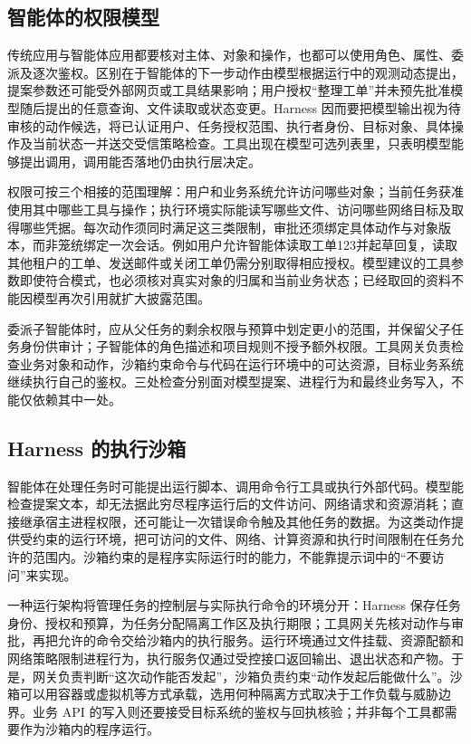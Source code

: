 \documentclass[../textbook.tex]{subfiles}
\begin{document}
\subsection{智能体的权限模型}
传统应用与智能体应用都要核对主体、对象和操作，也都可以使用角色、属性、委派及逐次鉴权。区别在于智能体的下一步动作由模型根据运行中的观测动态提出，提案参数还可能受外部网页或工具结果影响；用户授权“整理工单”并未预先批准模型随后提出的任意查询、文件读取或状态变更。Harness 因而要把模型输出视为待审核的动作候选，将已认证用户、任务授权范围、执行者身份、目标对象、具体操作及当前状态一并送交受信策略检查。工具出现在模型可选列表里，只表明模型能够提出调用，调用能否落地仍由执行层决定。

权限可按三个相接的范围理解：用户和业务系统允许访问哪些对象；当前任务获准使用其中哪些工具与操作；执行环境实际能读写哪些文件、访问哪些网络目标及取得哪些凭据。每次动作须同时满足这三类限制，审批还须绑定具体动作与对象版本，而非笼统绑定一次会话。例如用户允许智能体读取工单123并起草回复，读取其他租户的工单、发送邮件或关闭工单仍需分别取得相应授权。模型建议的工具参数即使符合模式，也必须核对真实对象的归属和当前业务状态；已经取回的资料不能因模型再次引用就扩大披露范围。

委派子智能体时，应从父任务的剩余权限与预算中划定更小的范围，并保留父子任务身份供审计；子智能体的角色描述和项目规则不授予额外权限。工具网关负责检查业务对象和动作，沙箱约束命令与代码在运行环境中的可达资源，目标业务系统继续执行自己的鉴权。三处检查分别面对模型提案、进程行为和最终业务写入，不能仅依赖其中一处。

\subsection{Harness 的执行沙箱}
智能体在处理任务时可能提出运行脚本、调用命令行工具或执行外部代码。模型能检查提案文本，却无法据此穷尽程序运行后的文件访问、网络请求和资源消耗；直接继承宿主进程权限，还可能让一次错误命令触及其他任务的数据。为这类动作提供受约束的运行环境，把可访问的文件、网络、计算资源和执行时间限制在任务允许的范围内。沙箱约束的是程序实际运行时的能力，不能靠提示词中的“不要访问”来实现。

一种运行架构将管理任务的控制层与实际执行命令的环境分开：Harness 保存任务身份、授权和预算，为任务分配隔离工作区及执行期限；工具网关先核对动作与审批，再把允许的命令交给沙箱内的执行服务。运行环境通过文件挂载、资源配额和网络策略限制进程行为，执行服务仅通过受控接口返回输出、退出状态和产物。于是，网关负责判断“这次动作能否发起”，沙箱负责约束“动作发起后能做什么”。沙箱可以用容器或虚拟机等方式承载，选用何种隔离方式取决于工作负载与威胁边界。业务 API 的写入则还要接受目标系统的鉴权与回执核验；并非每个工具都需要作为沙箱内的程序运行。
\end{document}
